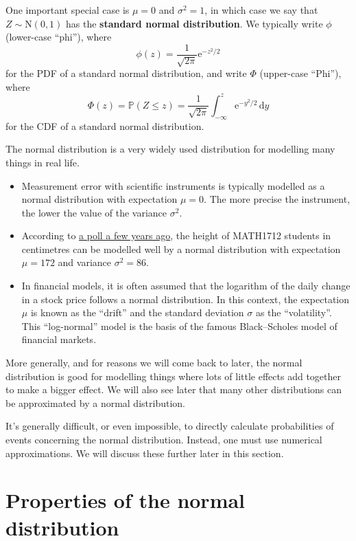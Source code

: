 \documentclass[
  a4paper,
]{book}
\providecommand{\tightlist}{%
  \setlength{\itemsep}{0pt}\setlength{\parskip}{0pt}}
\theoremstyle{definition}
\theoremstyle{definition}
\theoremstyle{definition}
\theoremstyle{definition}
\theoremstyle{remark}
\begin{document}
One important special case is \(\mu = 0\) and \(\sigma^2 = 1\), in which case we say that \(Z \sim \mathrm N(0,1)\) has the \textbf{standard normal distribution}. We typically write \(\phi\) (lower-case ``phi''), where
\[ \phi(z) = \frac{1}{\sqrt{2\pi}} \mathrm e^{-z^2/2} \]
for the PDF of a standard normal distribution, and write \(\Phi\) (upper-case ``Phi''), where
\[ \Phi(z) = \mathbb P(Z \leq z) = \frac{1}{\sqrt{2\pi}} \int_{-\infty}^z \mathrm e^{-y^2/2}\, \mathrm dy \]
for the CDF of a standard normal distribution.

The normal distribution is a very widely used distribution for modelling many things in real life.

\begin{itemize}
\tightlist
\item
  Measurement error with scientific instruments is typically modelled as a normal distribution with expectation \(\mu = 0\). The more precise the instrument, the lower the value of the variance \(\sigma^2\).
\item
  According to \href{http://www1.maths.leeds.ac.uk/~voss/2019/MATH1712/index.html}{a poll a few years ago}, the height of MATH1712 students in centimetres can be modelled well by a normal distribution with expectation \(\mu = 172\) and variance \(\sigma^2 = 86\).
\item
  In financial models, it is often assumed that the logarithm of the daily change in a stock price follows a normal distribution. In this context, the expectation \(\mu\) is known as the ``drift'' and the standard deviation \(\sigma\) as the ``volatility''. This ``log-normal'' model is the basis of the famous Black--Scholes model of financial markets.
\end{itemize}

More generally, and for reasons we will come back to later, the normal distribution is good for modelling things where lots of little effects add together to make a bigger effect. We will also see later that many other distributions can be approximated by a normal distribution.

It's generally difficult, or even impossible, to directly calculate probabilities of events concerning the normal distribution. Instead, one must use numerical approximations. We will discuss these further later in this section.

\hypertarget{normal-properties}{%
\section{Properties of the normal distribution}\label{normal-properties}}
\end{document}
